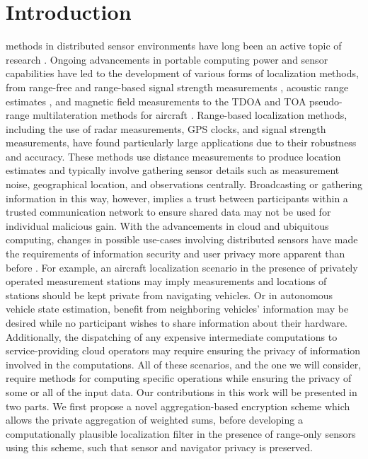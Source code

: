 \documentclass[10pt,letterpaper,oneside,twocolumn,journal]{IEEEtran}
\theoremstyle{definition}
\theoremstyle{definition}
\theoremstyle{remark}
\begin{document}
\section{Introduction}
 methods in distributed sensor environments have long been an active topic of research \cite{pierceIntroductionLoran1946,liContributedReviewSourcelocalization2016}. Ongoing advancements in portable computing power and sensor capabilities have led to the development of various forms of localization methods, from range-free and range-based signal strength measurements \cite{wangConvexCombinationSource2018,heRangeFreeLocalizationSchemes2003}, acoustic range estimates \cite{beutlerNewNonlinearFiltering2004}, and magnetic field measurements \cite{sieblerLocalizationMagneticField2020} to the TDOA and TOA pseudo-range multilateration methods for aircraft \cite{liContributedReviewSourcelocalization2016}. Range-based localization methods, including the use of radar measurements, GPS clocks, and signal strength measurements, have found particularly large applications due to their robustness and accuracy. These methods use distance measurements to produce location estimates and typically involve gathering sensor details such as measurement noise, geographical location, and observations centrally. Broadcasting or gathering information in this way, however, implies a trust between participants within a trusted communication network to ensure shared data may not be used for individual malicious gain. With the advancements in cloud and ubiquitous computing, changes in possible use-cases involving distributed sensors have made the requirements of information security and user privacy more apparent than before \cite{brennerSecretProgramExecution2011,renSecurityChallengesPublic2012}. For example, an aircraft localization scenario in the presence of privately operated measurement stations may imply measurements and locations of stations should be kept private from navigating vehicles. Or in autonomous vehicle state estimation, benefit from neighboring vehicles' information may be desired while no participant wishes to share information about their hardware. Additionally, the dispatching of any expensive intermediate computations to service-providing cloud operators may require ensuring the privacy of information involved in the computations. All of these scenarios, and the one we will consider, require methods for computing specific operations while ensuring the privacy of some or all of the input data. Our contributions in this work will be presented in two parts. We first propose a novel aggregation-based encryption scheme which allows the private aggregation of weighted sums, before developing a computationally plausible localization filter in the presence of range-only sensors using this scheme, such that sensor and navigator privacy is preserved.
\end{document}
